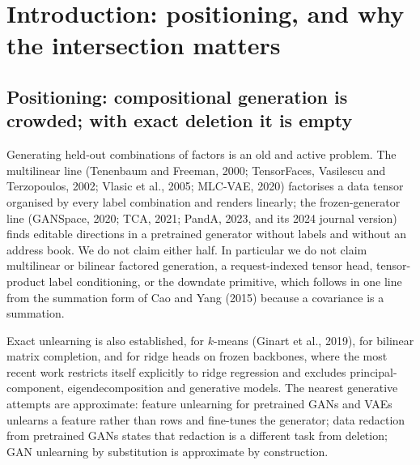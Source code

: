 \documentclass{article} %
\begin{document}
\section{Introduction: positioning, and why the intersection matters}
\label{sec:intro}

\subsection{Positioning: compositional generation is crowded; with exact deletion it is empty}
\label{sec:positioning}

Generating held-out combinations of factors is an old and active problem. The multilinear
line (Tenenbaum and Freeman, 2000; TensorFaces, Vasilescu and Terzopoulos, 2002; Vlasic et
al., 2005; MLC-VAE, 2020) factorises a data tensor organised by every label combination and
renders linearly; the frozen-generator line (GANSpace, 2020; TCA, 2021; PandA, 2023, and its
2024 journal version) finds editable directions in a pretrained generator without labels and
without an address book. We do not claim either half. In particular we do not claim
multilinear or bilinear factored generation, a request-indexed tensor head, tensor-product
label conditioning, or the downdate primitive, which follows in one line from the summation
form of Cao and Yang (2015) because a covariance is a summation.

Exact unlearning is also established, for $k$-means (Ginart et al., 2019), for bilinear
matrix completion, and for ridge heads on frozen backbones, where the most recent work
restricts itself explicitly to ridge regression and excludes principal-component,
eigendecomposition and generative models. The nearest generative attempts are approximate:
feature unlearning for pretrained GANs and VAEs unlearns a feature rather than rows and
fine-tunes the generator; data redaction from pretrained GANs states that redaction is a
different task from deletion; GAN unlearning by substitution is approximate by construction.
\end{document}
